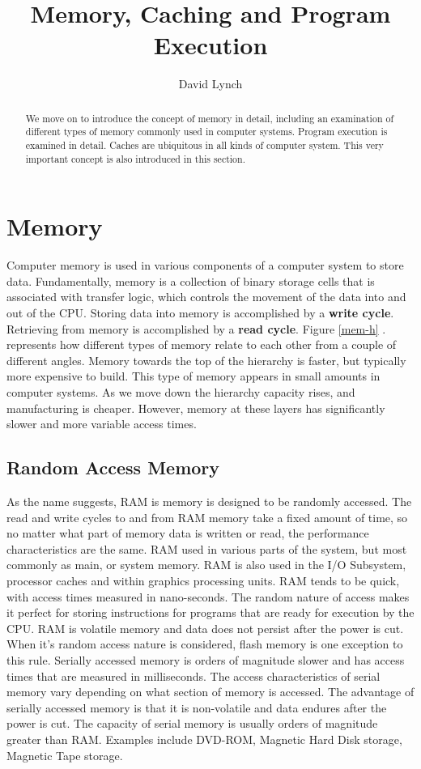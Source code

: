 \documentclass[10pt,a4paper]{article}
\title{Memory, Caching and Program Execution}
\author{David Lynch}
\begin{document}
\maketitle
\begin{abstract}
We move on to introduce the concept of memory in detail, including an examination of different types of memory commonly used in computer systems. Program execution is examined in detail. Caches are ubiquitous in all kinds of computer system. This very important concept is also introduced in this section. 
\end{abstract}
\section{Memory}
Computer memory is used in various components of a computer system to store data. Fundamentally, memory is a collection of binary storage cells that is associated with transfer logic, which controls the movement of the data into and out of the CPU. Storing data into memory is accomplished by a {\bf write cycle}. Retrieving from memory is accomplished by a {\bf read cycle}. Figure \ref{mem-h} . represents how different types of memory relate to each other from a couple of different angles. Memory towards the top of the hierarchy is faster, but typically more expensive to build. This type of memory appears in small amounts in computer systems. As we move down the hierarchy capacity rises, and manufacturing is cheaper. However, memory at these layers has significantly slower and more variable access times. 
\subsection{Random Access Memory}
As the name suggests, RAM is memory is designed to be randomly accessed. The read and write cycles to and from RAM memory take a fixed amount of time, so no matter what part of memory data is written or read, the performance characteristics are the same. RAM used in various parts of the system, but most commonly as main, or system memory. RAM is also used in the I/O Subsystem, processor caches and within graphics processing units. RAM tends to be quick, with access times measured in nano-seconds. The random nature of access makes it perfect for storing instructions for programs that are ready for execution by the CPU. RAM is volatile memory and data does not persist after the power is cut. When it's random access nature is considered, flash memory is one exception to this rule. 
\newline
Serially accessed memory is orders of magnitude slower and has access times that are measured in milliseconds. The access characteristics of serial memory vary depending on what section of memory is accessed. The advantage of serially accessed memory is that it is non-volatile and data endures after the power is cut. The capacity of serial memory is usually orders of magnitude greater than RAM. Examples include DVD-ROM, Magnetic Hard Disk storage, Magnetic Tape storage. 
\end{document}
